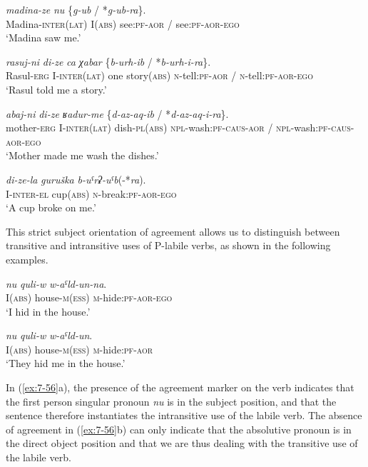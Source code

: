 ﻿\documentclass[output=paper]{langsci/langscibook}
\begin{document}
\ex %
\gll \emph{madina-ze} \emph{nu} \{\emph{g-ub} / *\emph{g-ub-ra}\}.\\
Madina-\textsc{inter(lat)} I(\textsc{abs}) see:\textsc{pf}-\textsc{aor} / see:\textsc{pf}-\textsc{aor}-\textsc{ego}\\
\glt `Madina saw me.'

\ex %
\gll \emph{rasuj-ni} \emph{di-ze} \emph{ca} \emph{χabar} \{\emph{b-urh-ib} / *\emph{b-urh-i-ra}\}.\\
Rasul-\textsc{erg} I-\textsc{inter(lat)} one story(\textsc{abs}) \textsc{n}-tell:\textsc{pf}-\textsc{aor} / \textsc{n}-tell:\textsc{pf}-\textsc{aor}-\textsc{ego}\\
\glt `Rasul told me a story.'

\ex %
\gll \emph{abaj-ni} \emph{di-ze} \emph{ʁadur-me} \{\emph{d-az-aq-ib} / *\emph{d-az-aq-i-ra}\}.\\
mother-\textsc{erg} I-\textsc{inter(lat)} dish-\textsc{pl}(\textsc{abs}) \textsc{npl}-wash:\textsc{pf}-\textsc{caus}-\textsc{aor} / \textsc{npl}-wash:\textsc{pf}-\textsc{caus}-\textsc{aor}-\textsc{ego}\\
\glt `Mother made me wash the dishes.'

\ex %
\gll \emph{di-ze-la} \emph{guruška} \emph{b-uˤrʡ-uˤb}(-*\emph{ra}).\\
I-\textsc{inter}-\textsc{el} cup(\textsc{abs}) \textsc{n}-break:\textsc{pf}-\textsc{aor}-\textsc{ego}\\
\glt `A cup broke on me.'
\z

This strict subject orientation of agreement allows us to distinguish
between transitive and intransitive uses of P-labile verbs, as shown in
the following examples.

\ea\label{ex:7-56} %
\ea %
\gll \emph{nu} \emph{quli-w} \emph{w-aˤld-un-na}.\\
I(\textsc{abs}) house-\textsc{m}(\textsc{ess}) \textsc{m}-hide:\textsc{pf}-\textsc{aor}-\textsc{ego}\\
\glt `I hid in the house.'

\ex %
\gll \emph{nu} \emph{quli-w} \emph{w-aˤld-un}.\\
I(\textsc{abs}) house-\textsc{m}(\textsc{ess}) \textsc{m}-hide:\textsc{pf}-\textsc{aor}\\
\glt `They hid me in the house.'
\z
\z

In (\ref{ex:7-56}a), the presence of the agreement marker on the verb indicates
that the first person singular pronoun \emph{nu} is in the subject
position, and that the sentence therefore instantiates the intransitive
use of the labile verb. The absence of agreement in (\ref{ex:7-56}b) can only
indicate that the absolutive pronoun is in the direct object position
and that we are thus dealing with the transitive use of the labile verb.
\end{document}
